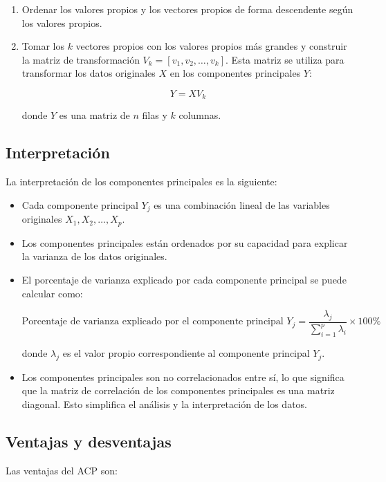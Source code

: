 \documentclass{article}
\begin{document}
\begin{itemize}
\begin{enumerate}
\item Ordenar los valores propios y los vectores propios de forma descendente según los valores propios. 

\item Tomar los $k$ vectores propios con los valores propios más grandes y construir la matriz de transformación $V_k = [v_1, v_2, \dots, v_k]$. Esta matriz se utiliza para transformar los datos originales $X$ en los componentes principales $Y$:

$$Y = X V_k$$

donde $Y$ es una matriz de $n$ filas y $k$ columnas.
\end{enumerate}

\subsection*{Interpretación}

La interpretación de los componentes principales es la siguiente:

\begin{itemize}
\item Cada componente principal $Y_j$ es una combinación lineal de las variables originales $X_1, X_2, \dots, X_p$.

\item Los componentes principales están ordenados por su capacidad para explicar la varianza de los datos originales.

\item El porcentaje de varianza explicado por cada componente principal se puede calcular como:

$$\text{Porcentaje de varianza explicado por el componente principal } Y_j = \frac{\lambda_j}{\sum_{i=1}^p \lambda_i} \times 100\%$$

donde $\lambda_j$ es el valor propio correspondiente al componente principal $Y_j$.

\item Los componentes principales son no correlacionados entre sí, lo que significa que la matriz de correlación de los componentes principales es una matriz diagonal. Esto simplifica el análisis y la interpretación de los datos.
\end{itemize}

\subsection*{Ventajas y desventajas}

Las ventajas del ACP son:


\end{itemize}
\end{document}
